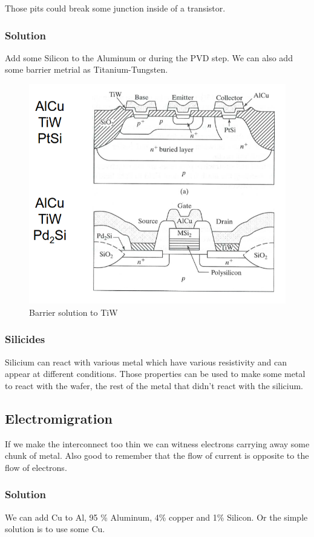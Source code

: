 \documentclass{report}
\begin{document}
Those pits could break some junction inside of a transistor.

\subsubsection{Solution}

Add some Silicon to the Aluminum or during the PVD step. We can also add some barrier metrial as Titanium-Tungsten.

\begin{figure}[H]
    \centering
    \includegraphics[width=0.5\linewidth]{Solution_tiw.png}
    \caption{Barrier solution to TiW}
    \label{fig:TiW-label}
\end{figure}

\subsubsection{Silicides}

Silicium can react with various metal which have various resistivity and can appear at different conditions. Those properties can be used to make some metal to react with the wafer, the rest of the metal that didn't react with the silicium.

\subsection{Electromigration}

If we make the interconnect too thin we can witness electrons carrying away some chunk of metal. Also good to remember that the flow of current is opposite to the flow of electrons. 

\subsubsection{Solution}

We can add Cu to Al, 95 \% Aluminum, 4\% copper and 1\% Silicon. Or the simple solution is to use some Cu.
\end{document}
